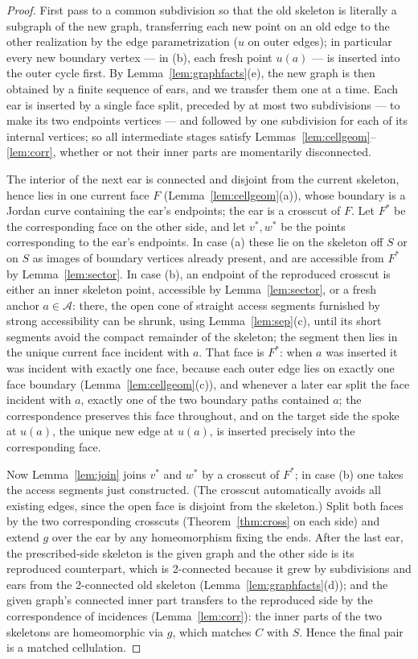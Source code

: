 \documentclass[11pt,a4paper]{article}
\theoremstyle{jsplain}
\theoremstyle{jsdefn}
\begin{document}
\begin{proof}
First pass to a common subdivision so that the old skeleton is
literally a subgraph of the new graph, transferring each new point on
an old edge to the other realization by the edge parametrization ($u$
on outer edges); in particular every new boundary vertex --- in (b),
each fresh point $u(a)$ --- is inserted into the outer cycle first.
By Lemma~\ref{lem:graphfacts}(e), the new graph is then obtained by a
finite sequence of ears, and we transfer them one at a time. Each ear
is inserted by a single face split, preceded by at most two
subdivisions --- to make its two endpoints vertices --- and followed by
one subdivision for each of its internal vertices; so all
intermediate stages satisfy Lemmas~\ref{lem:cellgeom}--\ref{lem:corr}, whether or not their
inner parts are momentarily disconnected.

The interior of the next ear is connected and disjoint from the
current skeleton, hence lies in one current face $F$
(Lemma~\ref{lem:cellgeom}(a)), whose boundary is a Jordan curve containing
the ear's endpoints; the ear is a crosscut of $F$. Let $F^*$ be the
corresponding face on the other side, and let $v^*,w^*$ be the points
corresponding to the ear's endpoints. In case (a) these lie on the
skeleton off $S$ or on $S$ as images of boundary vertices already
present, and are accessible from $F^*$ by
Lemma~\ref{lem:sector}. In case (b), an endpoint of the reproduced
crosscut is either an inner skeleton point, accessible by
Lemma~\ref{lem:sector}, or a fresh anchor $a\in\mathcal A$: there, the open cone of straight access
segments furnished by strong accessibility can be shrunk, using
Lemma~\ref{lem:sep}(c), until its short segments avoid the compact
remainder of the skeleton; the segment then lies
in the unique current face incident with $a$. That face is $F^*$: when
$a$ was inserted it was incident with exactly one face, because each
outer edge lies on exactly one face boundary
(Lemma~\ref{lem:cellgeom}(c)), and whenever a later ear split the face
incident with $a$, exactly one of the two boundary paths contained
$a$; the correspondence preserves this face throughout, and on the
target side the spoke at $u(a)$, the unique new edge at $u(a)$, is
inserted precisely into the corresponding face.

Now Lemma~\ref{lem:join} joins $v^*$ and $w^*$ by a crosscut of
$F^*$; in case (b) one takes the access segments just constructed.
(The crosscut automatically avoids all existing edges, since the open
face is disjoint from the skeleton.) Split both faces by the
two corresponding crosscuts (Theorem~\ref{thm:cross} on each side) and
extend $g$ over the ear by any homeomorphism fixing the ends. After
the last ear, the prescribed-side skeleton is the given graph and the
other side is its reproduced counterpart, which is 2-connected because
it grew by subdivisions and ears from the 2-connected old skeleton
(Lemma~\ref{lem:graphfacts}(d)); and the given graph's connected
inner part transfers to the reproduced side by the
correspondence of incidences (Lemma~\ref{lem:corr}): the
inner parts of the two skeletons are homeomorphic via $g$, which
matches $C$ with $S$. Hence the final pair is a matched cellulation.
\end{proof}
\end{document}
